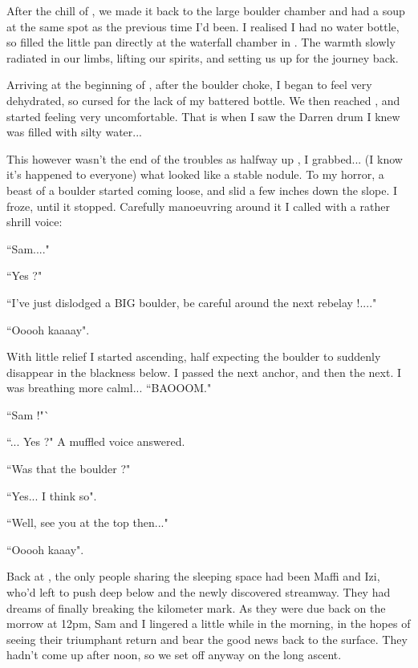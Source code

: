 After the chill of , we made it back to the large boulder chamber and had a soup at the same spot as the previous time I'd been. I realised I had no water bottle, so filled the little pan directly at the waterfall chamber in . The warmth slowly radiated in our limbs, lifting our spirits, and setting us up for the journey back.

Arriving at the beginning of , after the boulder choke, I began to feel very dehydrated, so cursed for the lack of my battered bottle. We then reached , and started feeling very uncomfortable. That is when I saw the Darren drum I knew was filled with silty water...

This however wasn't the end of the troubles as halfway up , I grabbed... (I know it's happened to everyone) what looked like a stable nodule. To my horror, a beast of a boulder started coming loose, and slid a few inches down the slope. I froze, until it stopped. Carefully manoeuvring around it I called with a rather shrill voice:
 
``Sam...."

 ``Yes ?" 

``I've just dislodged a BIG boulder, be careful around the next rebelay !...." 

``Ooooh kaaaay".

 With little relief I started ascending, half expecting the boulder to suddenly disappear in the blackness below. I passed the next anchor, and then the next. I was breathing more calml... 
``BAOOOM."

``Sam !"`

``... Yes ?" A muffled voice answered. 

``Was that the boulder ?"

 ``Yes... I think so".

 ``Well, see you at the top then..."

 ``Ooooh kaaay".

Back at , the only people sharing the sleeping space had been Maffi and Izi, who'd left to push deep below  and the newly discovered  streamway. They had dreams of finally breaking the kilometer mark. As they were due back on the morrow at 12pm, Sam and I lingered a little while in the morning, in the hopes of seeing their triumphant return and bear the good news back to the surface. They hadn't come up after noon, so we set off anyway on the long ascent. 

